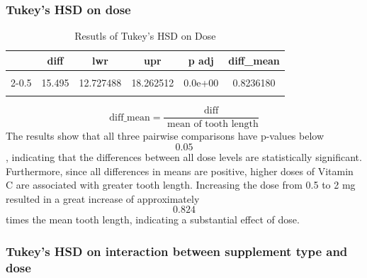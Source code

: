 \documentclass[
  11pt,
]{article}
\begin{document}
\subsubsection{Tukey's HSD on dose}\label{tukeys-hsd-on-dose}

\begin{table}[!h]
\centering
\caption{\label{tab:HSD on dose}Resutls of Tukey's HSD on Dose}
\centering
\fontsize{10}{12}\selectfont
\begin{tabular}[t]{lccccc}
\toprule
\textbf{ } & \textbf{diff} & \textbf{lwr} & \textbf{upr} & \textbf{p adj} & \textbf{diff\_mean}\\
\midrule
\cellcolor{gray!10}{1-0.5} & \cellcolor{gray!10}{9.130} & \cellcolor{gray!10}{6.362488} & \cellcolor{gray!10}{11.897512} & \cellcolor{gray!10}{0.0e+00} & \cellcolor{gray!10}{0.4852941}\\
2-0.5 & 15.495 & 12.727488 & 18.262512 & 0.0e+00 & 0.8236180\\
\cellcolor{gray!10}{2-1} & \cellcolor{gray!10}{6.365} & \cellcolor{gray!10}{3.597488} & \cellcolor{gray!10}{9.132513} & \cellcolor{gray!10}{2.7e-06} & \cellcolor{gray!10}{0.3383239}\\
\bottomrule
\end{tabular}
\end{table}

\[
\text{diff\_mean}
=
\frac{\text{diff}}
{\text{ mean of tooth length}}
\] The results show that all three pairwise comparisons have p-values
below \[0.05\], indicating that the differences between all dose levels
are statistically significant. Furthermore, since all differences in
means are positive, higher doses of Vitamin C are associated with
greater tooth length. Increasing the dose from 0.5 to 2 mg resulted in a
great increase of approximately \[0.824\] times the mean tooth length,
indicating a substantial effect of dose.

\subsubsection{Tukey's HSD on interaction between supplement type and
dose}\label{tukeys-hsd-on-interaction-between-supplement-type-and-dose}
\end{document}
